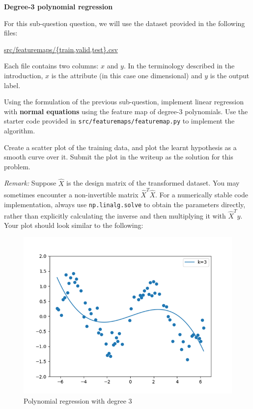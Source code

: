 \item {} {\bf Degree-3 polynomial regression}


For this sub-question question, we will use the dataset provided in
the following files:
%
\begin{center}
	\url{src/featuremaps/{train,valid,test}.csv}
\end{center}
%

Each file contains two columns: $x$ and $y$. In the terminology described in the introduction, $x$ is the attribute (in this case one dimensional) and $y$ is the output label.

Using the formulation of the previous sub-question, implement linear regression with \textbf{normal equations} using the feature map of degree-3 polynomials. Use the starter code provided in \texttt{src/featuremaps/featuremap.py} to implement the algorithm.

Create a scatter plot of the training data, and plot the learnt hypothesis as a smooth curve over it. Submit the plot in the writeup as the solution for this problem.

\emph{Remark: } Suppose $\widehat{X}$ is the design matrix of the transformed dataset. You may sometimes encounter a non-invertible matrix $\widehat{X}^T\widehat{X}$. For a numerically stable code implementation, always use \texttt{np.linalg.solve} to obtain the parameters directly, rather than explicitly calculating the inverse and then multiplying it with $\widehat{X}^Ty$.\\

Your plot should look similar to the following:
\begin{figure}[H]
  \centering
  \includegraphics[width=0.65\linewidth]{featuremaps/src/large-poly3.png}
  \centering
\caption{Polynomial regression with degree 3}
\end{figure}
